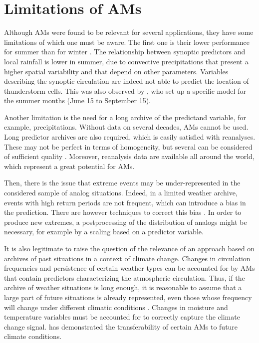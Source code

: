 \documentclass[review]{elsarticle}
\begin{document}
\section{Limitations of AMs}
\label{sec:limitations}

Although AMs were found to be relevant for several applications, they have some limitations of which one must be aware. The first one is their lower performance for summer than for winter \citep{Bliefernicht2010}. The relationship between synoptic predictors and local rainfall is lower in summer, due to convective precipitations that present a higher spatial variability and that depend on other parameters. Variables describing the synoptic circulation are indeed not able to predict the location of thunderstorm cells. This was also observed by \citet{BenDaoud2010}, who set up a specific model for the summer months (June 15 to September 15).

Another limitation is the need for a long archive of the predictand variable, for example, precipitations. Without data on several decades, AMs cannot be used. Long predictor archives are also required, which is easily satisfied with reanalyses. These may not be perfect in terms of homogeneity, but several can be considered of sufficient quality \cite{Horton2018b}. Moreover, reanalysis data are available all around the world, which represent a great potential for AMs.

Then, there is the issue that extreme events may be under-represented in the considered sample of analog situations. Indeed, in a limited weather archive, events with high return periods are not frequent, which can introduce a bias in the prediction. There are however techniques to correct this bias \citep[see][]{Marty2010}. In order to produce new extremes, a postprocessing of the distribution of analogs might be necessary, for example by a scaling based on a predictor variable. 

It is also legitimate to raise the question of the relevance of an approach based on archives of past situations in a context of climate change. Changes in circulation frequencies and persistence of certain weather types \citep{Hewitson1996} can be accounted for by AMs that contain predictors characterizing the atmospheric circulation. Thus, if the archive of weather situations is long enough, it is reasonable to assume that a large part of future situations is already represented, even those whose frequency will change under different climatic conditions \citep{Wetterhall2005}. Changes in moisture and temperature variables must be accounted for to correctly capture the climate change signal. \citet{Dayon2015} has demonstrated the transferability of certain AMs to future climate conditions.
\end{document}
